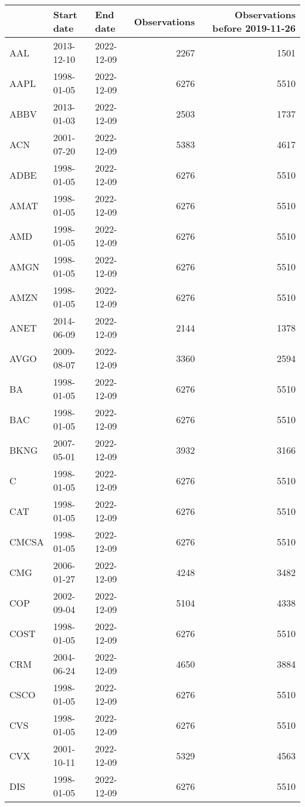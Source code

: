 \begin{table}[ht]
\centering
\begin{tabular}{lllrr}
  \hline
 & Start date & End date & Observations & Observations before 2019-11-26 \\ 
  \hline
AAL & 2013-12-10 & 2022-12-09 & 2267 & 1501 \\ 
  AAPL & 1998-01-05 & 2022-12-09 & 6276 & 5510 \\ 
  ABBV & 2013-01-03 & 2022-12-09 & 2503 & 1737 \\ 
  ACN & 2001-07-20 & 2022-12-09 & 5383 & 4617 \\ 
  ADBE & 1998-01-05 & 2022-12-09 & 6276 & 5510 \\ 
  AMAT & 1998-01-05 & 2022-12-09 & 6276 & 5510 \\ 
  AMD & 1998-01-05 & 2022-12-09 & 6276 & 5510 \\ 
  AMGN & 1998-01-05 & 2022-12-09 & 6276 & 5510 \\ 
  AMZN & 1998-01-05 & 2022-12-09 & 6276 & 5510 \\ 
  ANET & 2014-06-09 & 2022-12-09 & 2144 & 1378 \\ 
  AVGO & 2009-08-07 & 2022-12-09 & 3360 & 2594 \\ 
  BA & 1998-01-05 & 2022-12-09 & 6276 & 5510 \\ 
  BAC & 1998-01-05 & 2022-12-09 & 6276 & 5510 \\ 
  BKNG & 2007-05-01 & 2022-12-09 & 3932 & 3166 \\ 
  C & 1998-01-05 & 2022-12-09 & 6276 & 5510 \\ 
  CAT & 1998-01-05 & 2022-12-09 & 6276 & 5510 \\ 
  CMCSA & 1998-01-05 & 2022-12-09 & 6276 & 5510 \\ 
  CMG & 2006-01-27 & 2022-12-09 & 4248 & 3482 \\ 
  COP & 2002-09-04 & 2022-12-09 & 5104 & 4338 \\ 
  COST & 1998-01-05 & 2022-12-09 & 6276 & 5510 \\ 
  CRM & 2004-06-24 & 2022-12-09 & 4650 & 3884 \\ 
  CSCO & 1998-01-05 & 2022-12-09 & 6276 & 5510 \\ 
  CVS & 1998-01-05 & 2022-12-09 & 6276 & 5510 \\ 
  CVX & 2001-10-11 & 2022-12-09 & 5329 & 4563 \\ 
  DIS & 1998-01-05 & 2022-12-09 & 6276 & 5510 \\ 

\end{tabular}
\end{table}
